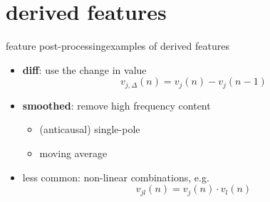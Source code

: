     \section[derived]{derived features}
		\begin{frame}{feature post-processing}{examples of derived features}
            \begin{itemize}
                \item   \textbf{diff}: use the change in value
                    \begin{equation*}
                        v_{j,\Delta}(n) = v_j(n) - v_j(n-1) 
                    \end{equation*}
                \smallskip
                \item<2-> \textbf{smoothed}: remove high frequency content
                    \begin{itemize}
                        \item	 (anticausal) single-pole
                        \item	moving average
                    \end{itemize}
                \smallskip
                \item<3->   less common: non-linear combinations, e.g.
                    \begin{equation*}
                        v_{jl}(n) = v_j(n) \cdot v_l(n) 
                    \end{equation*}
            \end{itemize}
		\end{frame}

